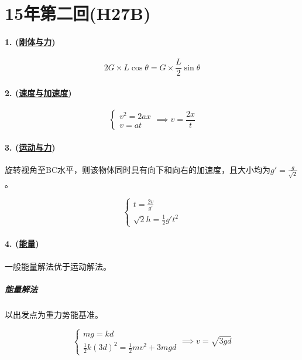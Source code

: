 
\section{15年第二回(H27B)}

\paragraph{1. (\hyperref[subsec:刚体与力]{刚体与力})}

\begin{equation*}
    2G\times L\cos\theta=G\times\frac{L}{2}\sin\theta
\end{equation*}

\paragraph{2. (\hyperref[subsec:速度与加速度]{速度与加速度})}

\begin{equation*}
    \begin{cases}
        v^2=2ax\\
        v=at
    \end{cases}\implies
    v=\frac{2x}{t}
\end{equation*}

\paragraph{3. (\hyperref[subsec:运动与力]{运动与力})} 旋转视角至BC水平，则该物体同时具有向下和向右的加速度，且大小均为$g'=\frac{g}{\sqrt{2}}$。

\begin{equation*}
    \begin{cases}
        t=\frac{2v}{g'}\\
        \sqrt{2}h=\frac12g't^2
    \end{cases}
\end{equation*}

\paragraph{4. (\hyperref[subsec:能量]{能量})} 一般能量解法优于运动解法。

\subparagraph{能量解法} 以出发点为重力势能基准。

\begin{equation*}
    \begin{cases}
        mg=kd\\
        \frac12k(3d)^2=\frac12mv^2+3mgd
    \end{cases}\implies
    v=\sqrt{3gd}
\end{equation*}

